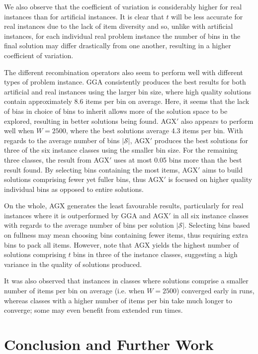 \documentclass[a4paper,11pt,authoryear]{elsarticle}
\begin{document}
We also observe that the coefficient of variation is considerably higher for real instances than for artificial instances. It is clear that $t$ will be less accurate for real instances due to the lack of item diversity and so, unlike with artificial instances, for each individual real problem instance the number of bins in the final solution may differ drastically from one another, resulting in a higher coefficient of variation.

The different recombination operators also seem to perform well with different types of problem instance. GGA consistently produces the best results for both artificial and real instances using the larger bin size, where high quality solutions contain approximately 8.6 items per bin on average. Here, it seems that the lack of bias in choice of bins to inherit allows more of the solution space to be explored, resulting in better solutions being found. AGX$'$ also appears to perform well when $W=2500$, where the best solutions average 4.3 items per bin. With regards to the average number of bins $|\mathcal{S}|$, AGX$'$ produces the best solutions for three of the six instance classes using the smaller bin size. For the remaining three classes, the result from AGX$'$ uses at most 0.05 bins more than the best result found. By selecting bins containing the most items, AGX$'$ aims to build solutions comprising fewer yet fuller bins, thus AGX$'$ is focused on higher quality individual bins as opposed to entire solutions.

On the whole, AGX generates the least favourable results, particularly for real instances where it is outperformed by GGA and AGX$'$ in all six instance classes with regards to the average number of bins per solution $|\mathcal{S}|$. Selecting bins based on fullness may mean choosing bins containing fewer items, thus requiring extra bins to pack all items. However, note that AGX yields the highest number of solutions comprising $t$ bins in three of the instance classes, suggesting a high variance in the quality of solutions produced.

It was also observed that instances in classes where solutions comprise a smaller number of items per bin on average (i.e. when $W=2500$) converged early in runs, whereas classes with a higher number of items per bin take much longer to converge; some may even benefit from extended run times.

\section{Conclusion and Further Work}
\label{sec:conclusion}
\end{document}

